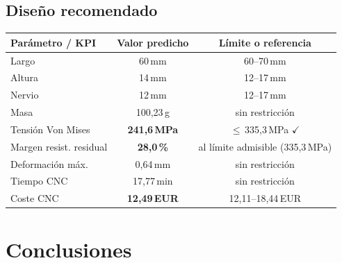 \documentclass[11pt, a4paper]{article}
\begin{document}
\subsection{Diseño recomendado}

\begin{tcolorbox}[
  colback=verdeclaro, colframe=verde, arc=4pt,
  title={\bfseries\color{white} Diseño óptimo - Parámetros y KPIs predichos},
  fonttitle=\normalsize
]
\begin{center}
\begin{tabular}{@{} l c c @{}}
  \toprule
  \textbf{Parámetro / KPI} & \textbf{Valor predicho} & \textbf{Límite o referencia}\\
  \midrule
  Largo                 & 60\,mm                        & 60--70\,mm               \\
  Altura                & 14\,mm                        & 12--17\,mm               \\
  Nervio                & 12\,mm                        & 12--17\,mm               \\
  \midrule
  Masa                  & 100{,}23\,g                   & sin restricción          \\
  Tensión Von Mises     & \textbf{\color{verde}241{,}6\,MPa}
                        & $\leq$\,335{,}3\,MPa \textcolor{verde}{$\checkmark$}   \\
  Margen resist. residual & \textbf{\color{verde}28{,}0\,\%}
                        & al límite admisible (335{,}3\,MPa)                      \\
  Deformación máx.      & 0{,}64\,mm                    & sin restricción          \\
  Tiempo CNC            & 17{,}77\,min                  & sin restricción          \\
  Coste CNC             & \textbf{12{,}49\,EUR}         & 12{,}11--18{,}44\,EUR    \\
  \bottomrule
\end{tabular}
\end{center}
\end{tcolorbox}


\newpage
\section{Conclusiones}
\end{document}
